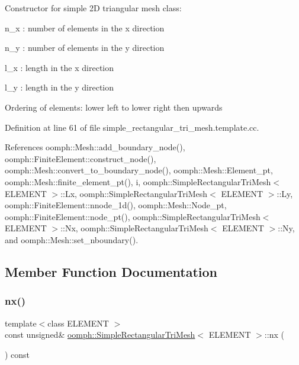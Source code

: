Constructor for simple 2D triangular mesh class\+:

n\+\_\+x \+: number of elements in the x direction

n\+\_\+y \+: number of elements in the y direction

l\+\_\+x \+: length in the x direction

l\+\_\+y \+: length in the y direction

Ordering of elements\+: \textquotesingle{}lower left\textquotesingle{} to \textquotesingle{}lower right\textquotesingle{} then \textquotesingle{}upwards\textquotesingle{} 

Definition at line 61 of file simple\+\_\+rectangular\+\_\+tri\+\_\+mesh.\+template.\+cc.



References oomph\+::\+Mesh\+::add\+\_\+boundary\+\_\+node(), oomph\+::\+Finite\+Element\+::construct\+\_\+node(), oomph\+::\+Mesh\+::convert\+\_\+to\+\_\+boundary\+\_\+node(), oomph\+::\+Mesh\+::\+Element\+\_\+pt, oomph\+::\+Mesh\+::finite\+\_\+element\+\_\+pt(), i, oomph\+::\+Simple\+Rectangular\+Tri\+Mesh$<$ E\+L\+E\+M\+E\+N\+T $>$\+::\+Lx, oomph\+::\+Simple\+Rectangular\+Tri\+Mesh$<$ E\+L\+E\+M\+E\+N\+T $>$\+::\+Ly, oomph\+::\+Finite\+Element\+::nnode\+\_\+1d(), oomph\+::\+Mesh\+::\+Node\+\_\+pt, oomph\+::\+Finite\+Element\+::node\+\_\+pt(), oomph\+::\+Simple\+Rectangular\+Tri\+Mesh$<$ E\+L\+E\+M\+E\+N\+T $>$\+::\+Nx, oomph\+::\+Simple\+Rectangular\+Tri\+Mesh$<$ E\+L\+E\+M\+E\+N\+T $>$\+::\+Ny, and oomph\+::\+Mesh\+::set\+\_\+nboundary().



\subsection{Member Function Documentation}
\mbox{\label{classoomph_1_1SimpleRectangularTriMesh_ac8fcc898b00209b300684dd8addd9b4f}} 
\subsubsection{\texorpdfstring{nx()}{nx()}}
{\footnotesize\ttfamily template$<$class E\+L\+E\+M\+E\+NT $>$ \\
const unsigned\& \hyperlink{classoomph_1_1SimpleRectangularTriMesh}{oomph\+::\+Simple\+Rectangular\+Tri\+Mesh}$<$ E\+L\+E\+M\+E\+NT $>$\+::nx (\begin{DoxyParamCaption}{ }\end{DoxyParamCaption}) const\hspace{0.3cm}{\ttfamily [inline]}}



